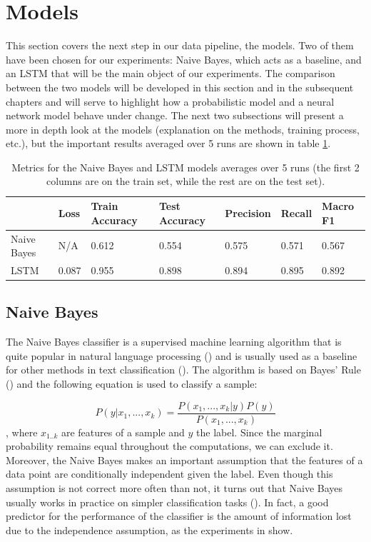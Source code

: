 \documentclass[12pt]{extreport}
\begin{document}
\section{Models} \label{sec:models}

This section covers the next step in our data pipeline, the models. Two of them have been chosen for our experiments: Naive Bayes, which acts as a baseline, and an LSTM that will be the main object of our experiments. The comparison between the two models will be developed in this section and in the subsequent chapters and will serve to highlight how a probabilistic model and a neural network model behave under change. The next two subsections will present a more in depth look at the models (explanation on the methods, training process, etc.), but the important results averaged over 5 runs are shown in table \ref{table:model-metrics}.

\begin{table}[ht!]
\centering
\begin{tabular}{|l|l|l|l|l|l|l|}
\hline
            & Loss & Train Accuracy & Test Accuracy & Precision & Recall & Macro F1 \\ \hline
Naive Bayes & N/A        & 0.612          & 0.554         & 0.575          & 0.571       & 0.567         \\ \hline
LSTM        & 0.087      & 0.955          & 0.898         & 0.894          & 0.895       & 0.892         \\ \hline
\end{tabular}
\caption{Metrics for the Naive Bayes and LSTM models averages over 5 runs (the first 2 columns are on the train set, while the rest are on the test set).}
\label{table:model-metrics}
\end{table}

\subsection{Naive Bayes} \label{sec:nb}

The Naive Bayes classifier is a supervised machine learning algorithm that is quite popular in natural language processing (\cite{naivebayes}) and is usually used as a baseline for other methods in text classification (\cite{nb-baseline}). The algorithm is based on Bayes' Rule (\cite{bayesrule}) and the following equation is used to classify a sample:

\begin{equation}
    P(y|x_1, ..., x_k) = \frac{P(x_1, ..., x_k|y)P(y)}{P(x_1, ..., x_k)}
\end{equation}
, where $x_{1..k}$ are features of a sample and $y$ the label. Since the marginal probability remains equal throughout the computations, we can exclude it. Moreover, the Naive Bayes makes an important assumption that the features of a data point are conditionally independent given the label. Even though this assumption is not correct more often than not, it turns out that Naive Bayes usually works in practice on simpler classification tasks (\cite{naivebayes}). In fact, a good predictor for the performance of the classifier is the amount of information lost due to the independence assumption, as the experiments in \cite{naivebayes} show.
\end{document}
